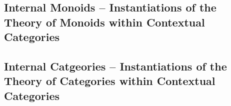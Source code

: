 \documentclass[10pt,a4paper]{article}
\theoremstyle{remark}
\begin{document}
\subsection{Internal Monoids -- Instantiations of the Theory of Monoids within Contextual Categories}
\label{monoidsinstantiationexample} 
 


\subsection{Internal Catgeories -- Instantiations of the Theory of Categories within Contextual Categories}

\label{categoriesinstantiationexample}


%

% 


\end{document}

